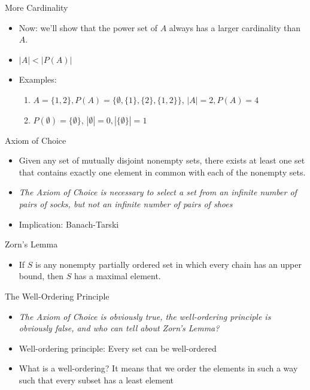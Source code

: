 \documentclass{beamer}
\begin{document}
\begin{frame}{More Cardinality}
\begin{itemize}
\item Now: we'll show that the power set of $A$ always has a larger cardinality than $A$.
\item $|A|<|P(A)|$
\item Examples:
\begin{enumerate}
\item $A = \{1,2\}, P(A) = \{\emptyset, \{1\}, \{2\}, \{1,2\}\}$, $|A|=2, P(A)=4$
\item $P(\emptyset) = \{\emptyset\}$, $|\emptyset| = 0, |\{\emptyset\}| = 1$
\end{enumerate}
\end{itemize}
\end{frame}

\begin{frame}{Axiom of Choice}
\begin{itemize}
\item Given any set of mutually disjoint nonempty sets, there exists at least one set that contains exactly one element in common with each of the nonempty sets.
\item \textit{The Axiom of Choice is necessary to select a set from an infinite number of pairs of socks, but not an infinite number of pairs of shoes}
\item Implication: Banach-Tarski
\end{itemize}
\end{frame}

\begin{frame}{Zorn's Lemma}
\begin{itemize}
\item If $S$ is any nonempty partially ordered set in which every chain has an upper bound, then $S$ has a maximal element.
\end{itemize}
\end{frame}

\begin{frame}{The Well-Ordering Principle}
\begin{itemize}
\item \textit{The Axiom of Choice is obviously true, the well-ordering principle is obviously false, and who can tell about Zorn's Lemma?}
\item Well-ordering principle: Every set can be well-ordered
\item What is a well-ordering? It means that we order the elements in such a way such that every subset has a least element
\end{itemize}
\end{frame}
\end{document}
